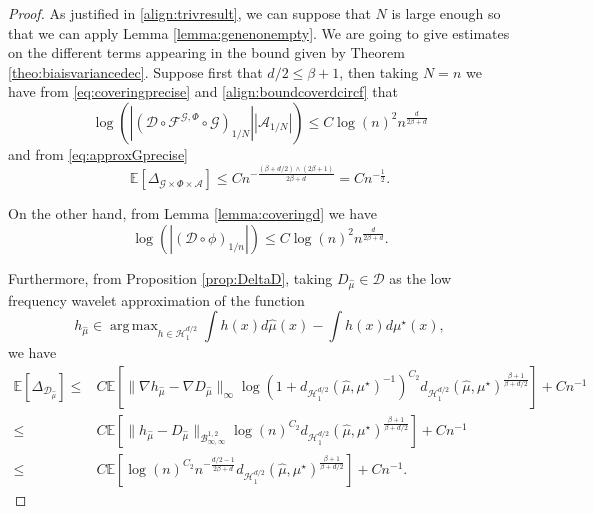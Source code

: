\documentclass[10pt]{article}
\DeclareMathOperator*{\argmax}{arg\,max}
\begin{document}
\begin{proof} As justified in \eqref{align:trivresult}, we can suppose that $N$ is large enough so that we can apply Lemma \ref{lemma:genenonempty}. We are going to give estimates on the different terms appearing in the bound given by Theorem \ref{theo:biaisvariancedec}.
Suppose first that $d/2\leq \beta+1$, then taking $N=n$ we have from \eqref{eq:coveringprecise} and \eqref{align:boundcoverdcircf} that
$$\log(|(\mathcal{D}\circ\mathcal{F}^{\mathcal{G},\Phi}\circ \mathcal{G})_{1/N}||\mathcal{A}_{1/N}|)\leq C \log(n)^2 n^{\frac{d}{2\beta+d}}$$
and from \eqref{eq:approxGprecise}
$$\mathbb{E}[\Delta_{\mathcal{G}\times \Phi \times \mathcal{A}}]\leq Cn^{-\frac{(\beta + d/2)\wedge (2\beta+1)}{2\beta+d}}=Cn^{-\frac{1}{2}}.$$

On the other hand, from Lemma \ref{lemma:coveringd} we have 
$$\log(|(\mathcal{D}\circ \phi)_{1/n}|)\leq  C \log(n)^2 n^{\frac{d}{2\beta+d}}.$$

Furthermore, from Proposition \ref{prop:DeltaD}, taking $D_{\hat{\mu}}\in \mathcal{D}$ as the low frequency wavelet approximation of the function
$$h_{\hat{\mu}} \in \argmax_{h\in \mathcal{H}^{d/2}_1} \int h(x)d\hat{\mu}(x)-\int h(x)d\mu^\star(x),$$
we have
\begin{align*}
    \mathbb{E}[\Delta_{\mathcal{D}_{\hat{\mu}}}]\leq & C\mathbb{E}[\|\nabla h_{\hat{\mu}}-\nabla D_{\hat{\mu}}\|_\infty\log\left(1+d_{\mathcal{H}^{d/2}_1}(\hat{\mu},\mu^\star)^{-1}\right)^{C_2} d_{\mathcal{H}^{d/2}_1}(\hat{\mu},\mu^\star)^{\frac{\beta+1}{\beta+d/2}}]+Cn^{-1}\\
    \leq & C\mathbb{E}[\|h_{\hat{\mu}}-D_{\hat{\mu}}\|_{\mathcal{B}^{1,2}_{\infty,\infty}}\log\left(n\right)^{C_2} d_{\mathcal{H}^{d/2}_1}(\hat{\mu},\mu^\star)^{\frac{\beta+1}{\beta+d/2}}]+Cn^{-1}
    \\
    \leq & C\mathbb{E}[\log\left(n\right)^{C_2}  n^{-\frac{d/2-1}{2\beta+d}}d_{\mathcal{H}^{d/2}_1}(\hat{\mu},\mu^\star)^{\frac{\beta+1}{\beta+d/2}}]+Cn^{-1}.
\end{align*}


\end{proof}
\end{document}
